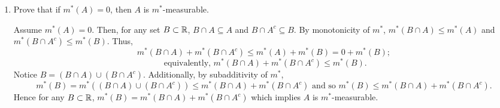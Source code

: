 \begin{enumerate}
\item Prove that if $m^{*}(A)=0$, then $A$ is $m^{*}$-measurable.
	\begin{pf}
Assume $m^{*}(A)=0$. Then, for any set $B \subset {\mathbb R}$, $B \cap A \subseteq A$ and $B \cap A^c \subseteq B$. By monotonicity of $m^{*}$, $m^{*}(B \cap A) \leq m^{*}(A)$ and $m^{*}(B \cap A^c) \leq m^{*}(B)$. Thus, 
\[
m^{*}(B \cap A) + m^{*}(B \cap A^c) \leq m^{*}(A) +  m^{*}(B)= 0 + m^{*}(B);
\]
\[
\text{ equivalently,  } m^{*}(B \cap A) + m^{*}(B \cap A^c) \leq m^{*}(B).
\]
Notice  $B=(B \cap A) \cup (B \cap A^c)$. Additionally, by subadditivity of $m^{*}$,
\[ m^{*}(B)=m^{*}((B \cap A) \cup (B \cap A^c)) \leq m^{*}(B \cap A) + m^{*}(B \cap A^c) \text{ and so } m^{*}(B)\leq m^{*}(B \cap A) + m^{*}(B \cap A^c).
\]
Hence for any $B \subset {\mathbb R}$, $m^{*}(B) = m^{*}(B \cap A) + m^{*}(B \cap A^c)$ which implies $A$ is $m^{*}$-measurable.
\end{pf}


\end{enumerate}
